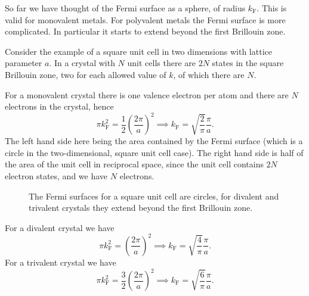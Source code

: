 \documentclass[fleqn]{NotesClass}
\newcommand*{\fermi}{\mathrm{F}}
\begin{document}
    So far we have thought of the Fermi surface as a sphere, of radius \(k_{\fermi}\).
    This is valid for monovalent metals.
    For polyvalent metals the Fermi surface is more complicated.
    In particular it starts to extend beyond the first Brillouin zone.
    
    Consider the example of a square unit cell in two dimensions with lattice parameter \(a\).
    In a crystal with \(N\) unit cells there are \(2N\) states in the square Brillouin zone, two for each allowed value of \(k\), of which there are \(N\).
    
    For a monovalent crystal there is one valence electron per atom and there are \(N\) electrons in the crystal, hence
    \begin{equation}
        \pi k_{\fermi}^2 = \frac{1}{2}\left( \frac{2\pi}{a} \right)^2 \implies k_{\fermi} = \sqrt{\frac{2}{\pi}} \frac{\pi}{a}.
    \end{equation}
    The left hand side here being the area contained by the Fermi surface (which is a circle in the two-dimensional, square unit cell case).
    The right hand side is half of the area of the unit cell in reciprocal space, since the unit cell contains \(2N\) electron states, and we have \(N\) electrons.
    
    \begin{figure}
        \caption[Square unit cell Fermi surfaces]{The Fermi surfaces for a square unit cell are circles, for divalent and trivalent crystals they extend beyond the first Brillouin zone.}
    \end{figure}
    
    For a divalent crystal we have
    \begin{equation}
        \pi k_{\fermi}^2 = \left( \frac{2\pi}{a} \right)^2 \implies k_{\fermi} = \sqrt{\frac{4}{\pi}}\frac{\pi}{a}.
    \end{equation}
    For a trivalent crystal we have
    \begin{equation}
        \pi k_{\fermi}^2 = \frac{3}{2} \left( \frac{2\pi}{a} \right)^2 \implies k_{\fermi} = \sqrt{\frac{6}{\pi}}\frac{\pi}{a}.
    \end{equation}
    
\end{document}
